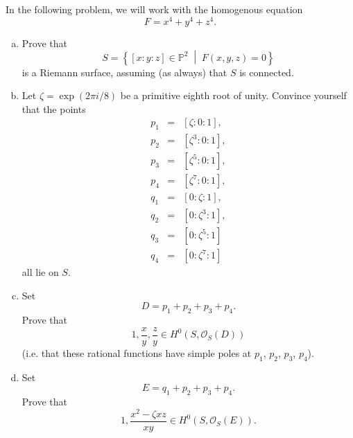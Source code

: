\documentclass[10pt]{amsart}
\begin{document}
\begin{thm}
  In the following problem, we will work with the homogenous equation
  $$F = x^4 + y^4 + z^4.$$
  \begin{enumerate}[(a)]
  \item
    Prove that
    $$S = \left\{ [x : y : z] \in \mathbb{P}^2 \;\middle\vert\; F(x,y,z) = 0 \right\}$$
    is a Riemann surface, assuming (as always) that $S$ is connected.
  \item
    Let $\zeta = \exp\left(2\pi i / 8\right)$ be a primitive eighth root of unity.
    Convince yourself that the points
    \begin{eqnarray*}
      p_1 &=& [\zeta : 0 : 1],\\
      p_2 &=& [\zeta^3 : 0 : 1],\\
      p_3 &=& [\zeta^5 : 0 : 1],\\
      p_4 &=& [\zeta^7 : 0 : 1],\\
      q_1 &=& [0 : \zeta : 1],\\
      q_2 &=& [0 : \zeta^3 : 1],\\
      q_3 &=& [0 : \zeta^5 : 1]\\
      q_4 &=& [0 : \zeta^7 : 1]
    \end{eqnarray*}
    all lie on $S$.
  \item
    Set 
    $$D = p_1 + p_2 + p_3 + p_4.$$
    Prove that
    $$1, \frac{x}{y}, \frac{z}{y} \in H^0\left(S, \mathcal{O}_S(D)\right)$$
    (i.e. that these rational functions have simple poles at $p_1$, $p_2$, $p_3$, $p_4$).
  \item
    Set
    $$E = q_1 + p_2 + p_3 + p_4.$$
    Prove that
    $$1, \frac{x^2 - \zeta x z}{xy} \in H^0\left(S, \mathcal{O}_S(E)\right).$$
  \end{enumerate}
  

\end{thm}
\end{document}

